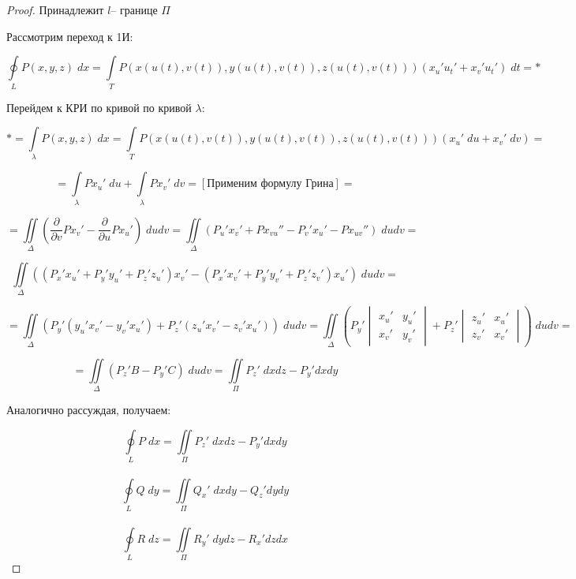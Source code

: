 \documentclass[../../main.tex]{subfiles}
\begin{document}
\begin{theorem}
\begin{proof}
			 Принадлежит $l$\--- границе $\Pi$
			 
			 Рассмотрим переход к 1И:
			 
			 \[ \oint \limits_L P\left( x,y,z \right) \; dx = \int \limits_T P \left( x\left( u\left( t\right), v\left( t\right)   \right), y\left( u\left( t\right), v\left( t\right)   \right)  ,z\left( u\left( t\right), v\left( t\right)   \right) \right) \left( x_u' u_t' + x_v' u_t' \right) \; dt = *  \]
			 
			 Перейдем к КРИ по кривой по кривой $\lambda$:
			 
			 \[ * = \int \limits_{\lambda} P\left( x,y,z \right) \; dx = \int \limits_T P \left( x\left( u\left( t\right), v\left( t\right)   \right), y\left( u\left( t\right), v\left( t\right)   \right)  ,z\left( u\left( t\right), v\left( t\right)   \right) \right) \left( x_u' \; du + x_v ' \; dv \right) =  \]
			 
			 \[ = \int \limits_{\lambda} P x_u' \; du + \int \limits_{\lambda} P x_v' \; dv =  \left[   \text{Применим формулу Грина}  \right] =   \]
			 
			 \[ = \iint \limits_{\Delta} \left( \frac{\partial}{\partial{v}} P x_v' - \frac{\partial}{\partial{u}} P x_u' \right) \; du dv = \iint \limits_{\Delta} \left(
			 P_u' x_v ' + P x_{vu} '' - P_v' x_u' - P x_{uv}'' \right) \; du dv  =  \]
			 
			 \[ \iint \limits_{\Delta} \left( \left( P_x' x_u' + P_y' y_u' + P_z ' z_u' \right) x_v' - \left( P_x' x_v' + P_y' y_v' + P_z ' z_v' \right) x_u'  \right) \; du dv =  \]
			
			\[ = \iint \limits_{\Delta} \left( P_y'\left( y_u' x_v' - y_v' x_u' \right) + P_z'\left( z_u' x_v' - z_v' x_u' \right)   \right) \; du dv = \iint \limits_{\Delta} \left( P_y' \begin{vmatrix} x_u' & y_u' \\ x_v' & y_v'  \end{vmatrix} + P_z' \begin{vmatrix} z_u' & x_u' \\ z_v' & x_v'  \end{vmatrix} \right) \; dudv =      \]
			
			\[ = \iint \limits_{\Delta}  \left( P_z' B - P_y' C  \right) \; dudv = \iint \limits_{\Pi}  P_z' \; dxdz - P_y' dxdy     \]
			
			Аналогично рассуждая, получаем:
			
			 \begin{equation} \label{P_oints_Stocks} \oint \limits_L P \; dx = \iint \limits_{\Pi}  P_z' \; dxdz - P_y' dxdy \end{equation}\\
			\begin{equation}  \label{Q_oints_Stocks} \oint \limits_L Q \; dy = \iint \limits_{\Pi}  Q_x' \; dxdy - Q_z' dydy \end{equation}\\
			\begin{equation}  \label{R_oints_Stocks} \oint \limits_L R \; dz = \iint \limits_{\Pi}  R_y' \; dydz - R_x' dzdx \end{equation}
			

\end{proof}
\end{theorem}
\end{document}
